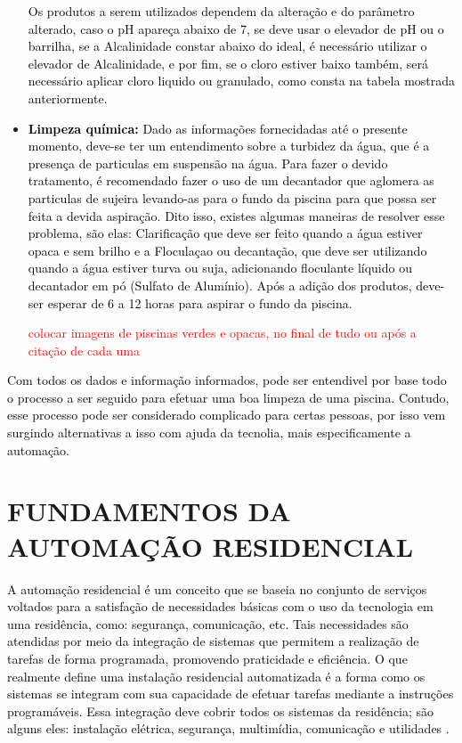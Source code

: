 \begin{itemize}
            \textcolor{black}{Os produtos a serem utilizados dependem da alteração e do parâmetro alterado, caso o pH apareça abaixo de 7, se deve usar o elevador de pH ou o barrilha, se a Alcalinidade constar abaixo do ideal, é necessário utilizar o elevador de Alcalinidade, e por fim, se o cloro estiver baixo também, será necessário aplicar cloro liquido ou granulado, como consta na tabela mostrada anteriormente.}


            \item \textbf{\textcolor{black}{Limpeza química:}} \textcolor{black}{Dado as informações fornecidadas até o presente momento, deve-se ter um entendimento sobre a turbidez da água, que é a presença de particulas em suspensão na água. Para fazer o devido tratamento, é recomendado fazer o uso de um decantador que aglomera as particulas de sujeira levando-as para o fundo da piscina para que possa ser feita a devida aspiração. Dito isso, existes algumas maneiras de resolver esse problema, são elas: Clarificação que deve ser feito quando a água estiver opaca e sem brilho e a Floculaçao ou decantação, que deve ser utilizando quando a água estiver turva ou suja, adicionando floculante líquido ou decantador em pó (Sulfato de Alumínio). Após a adição dos produtos, deve-ser esperar de 6 a 12 horas para aspirar o fundo da piscina.}

            \textcolor{red}{colocar imagens de piscinas verdes e opacas, no final de tudo ou após a citação de cada uma}
            
        \end{itemize}

        \textcolor{black}{Com todos os dados e informação informados, pode ser entendivel por base todo o processo a ser seguido para efetuar uma boa limpeza de uma piscina. Contudo, esse processo pode ser considerado complicado para certas pessoas, por isso vem surgindo alternativas a isso com ajuda da tecnolia, mais especificamente a automação.}
         
   
\section{FUNDAMENTOS DA AUTOMAÇÃO RESIDENCIAL}
    \textcolor{black}{A automação residencial é um conceito que se baseia no conjunto de serviços voltados para a satisfação de necessidades básicas com o uso da tecnologia em uma residência, como: segurança, comunicação, etc. Tais necessidades são atendidas por meio da integração de sistemas que permitem a realização de tarefas de forma programada, promovendo praticidade e eficiência. O que realmente define uma instalação residencial automatizada é a forma como os sistemas se integram com sua capacidade de efetuar tarefas mediante a instruções programáveis. Essa integração deve cobrir todos os sistemas da residência; são alguns eles: instalação elétrica, segurança, multimídia, comunicação e utilidades \cite{automacaoResidencialCap1}.}

